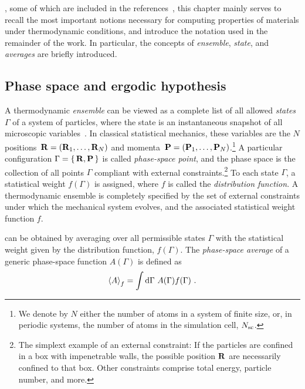 , some of which are included in the references~\cite{Phillies2012,Tuckerman,Schrodinger1989}, this chapter mainly serves to recall the most important notions necessary for computing properties of materials under thermodynamic conditions, and introduce the notation used in the remainder of the work. In particular, the concepts of \emph{ensemble}, \emph{state}, and \emph{averages} are briefly introduced.

\subsection{Phase space and ergodic hypothesis}

A thermodynamic \emph{ensemble} can be viewed as a complete list of all allowed \emph{states} $\Gamma$ of a system of particles, where the state is an instantaneous snapshot of all microscopic variables~\cite{Phillies2012}. In classical statistical mechanics, these variables are the $N$ positions~${\bf R} = ({\bf R}_1, \ldots, {\bf R}_{N})$ and momenta~${\bf P} = ({\bf P}_1, \ldots, {\bf P}_{N})$.\footnote{We denote by $N$ either the number of atoms in a system of finite size, or, in periodic systems, the number of atoms in the simulation cell, $N_{\rm sc}$.} A particular configuration $\Gamma = \set{{\bf R}, {\bf P}}$ is called \emph{phase-space point}, and the phase space is the collection of all points $\Gamma$ compliant with external constraints.\footnote{The simplext example of an external constraint: If the particles are confined in a box with impenetrable walls, the possible position ${\bf R}$ are necessarily confined to that box. Other constraints comprise total energy, particle number, and more.} To each state $\Gamma$, a statistical weight $f (\Gamma)$ is assigned, where $f$ is called the \emph{distribution function}. A thermodynamic ensemble is completely specified by the set of external constraints under which the mechanical system evolves, and the associated statistical weight function $f$.

 can be obtained by averaging over all permissible states $\Gamma$ with the statistical weight given by the distribution function, $f (\Gamma)$. The \emph{phase-space average} of a generic phase-space function $A (\Gamma)$ is defined as
\begin{align}
  \braket{A}_f 
    = \int \d \Gamma ~ A(\Gamma) f (\Gamma)~.
  \label{eq:phase.space.average}
\end{align}

